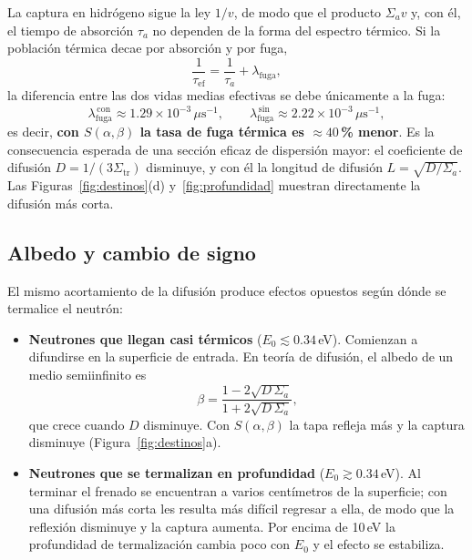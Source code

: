 \documentclass[11pt,a4paper]{article}
\newcommand{\sab}{$S(\alpha,\beta)$}
\begin{document}
La captura en hidrógeno sigue la ley $1/v$, de modo que el producto $\Sigma_a v$ y, con él, el tiempo de absorción $\tau_a$ no dependen de la forma del espectro térmico. Si la población térmica decae por absorción y por fuga,
\begin{equation}
  \frac{1}{\tau_\mathrm{ef}} = \frac{1}{\tau_a} + \lambda_\mathrm{fuga},
\end{equation}
la diferencia entre las dos vidas medias efectivas se debe únicamente a la fuga:
\begin{equation*}
  \lambda_\mathrm{fuga}^{\,\mathrm{con}} \approx 1.29\times10^{-3}\,\mu\mathrm{s}^{-1},\qquad
  \lambda_\mathrm{fuga}^{\,\mathrm{sin}} \approx 2.22\times10^{-3}\,\mu\mathrm{s}^{-1},
\end{equation*}
es decir, \textbf{con \sab{} la tasa de fuga térmica es $\approx40$\,\% menor}. Es la consecuencia esperada de una sección eficaz de dispersión mayor: el coeficiente de difusión $D=1/(3\Sigma_\mathrm{tr})$ disminuye, y con él la longitud de difusión $L=\sqrt{D/\Sigma_a}$. Las Figuras~\ref{fig:destinos}(d) y~\ref{fig:profundidad} muestran directamente la difusión más corta.

\subsection{Albedo y cambio de signo}

El mismo acortamiento de la difusión produce efectos opuestos según dónde se termalice el neutrón:
\begin{itemize}
  \item \textbf{Neutrones que llegan casi térmicos} ($E_0\lesssim0.34$\,eV). Comienzan a difundirse en la superficie de entrada. En teoría de difusión, el albedo de un medio semiinfinito es
  \begin{equation}
    \beta = \frac{1-2\sqrt{D\,\Sigma_a}}{1+2\sqrt{D\,\Sigma_a}},
  \end{equation}
  que crece cuando $D$ disminuye. Con \sab{} la tapa refleja más y la captura disminuye (Figura~\ref{fig:destinos}a).
  \item \textbf{Neutrones que se termalizan en profundidad} ($E_0\gtrsim0.34$\,eV). Al terminar el frenado se encuentran a varios centímetros de la superficie; con una difusión más corta les resulta más difícil regresar a ella, de modo que la reflexión disminuye y la captura aumenta. Por encima de 10\,eV la profundidad de termalización cambia poco con $E_0$ y el efecto se estabiliza.
\end{itemize}
\end{document}

